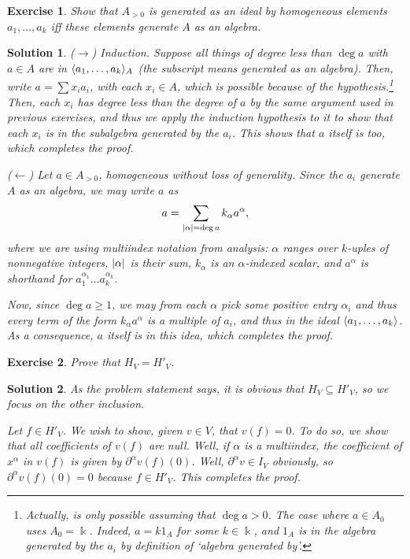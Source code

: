 \documentclass{article}
\newtheorem{ex}{Exercise}
\theoremstyle{nonumberplain}
\newtheorem{sol}{Solution}
\newcommand{\kk}{\Bbbk}
\DeclarePairedDelimiter{\abs}{\lvert}{\rvert}
\DeclarePairedDelimiter{\braket}{\langle}{\rangle}
\begin{document}
\begin{ex}
Show that $A_{>0}$ is generated as an ideal by homogeneous elements $a_1, \dots, a_k$ iff these elements generate $A$ as an algebra.
\end{ex}

\begin{sol}
($\rightarrow$) Induction. Suppose all things of degree less than $\deg a$ with $a \in A$ are in $\braket{a_1, \dots, a_k}_A$ (the subscript means generated as an algebra). Then, write $a = \sum x_i a_i$, with each $x_i \in A$, which is possible because of the hypothesis.\footnote{Actually, is only possible assuming that $\deg a > 0$. The case where $a \in A_0$ uses $A_0 = \kk$. Indeed, $a = k 1_A$ for some $k \in \kk$, and $1_A$ is in the algebra generated by the $a_i$ by definition of `algebra generated by'.} Then, each $x_i$ has degree less than the degree of $a$ by the same argument used in previous exercises, and thus we apply the induction hypothesis to it to show that each $x_i$ is in the subalgebra generated by the $a_i$. This shows that $a$ itself is too, which completes the proof.

($\leftarrow$) Let $a \in A_{>0}$, homogeneous without loss of generality. Since the $a_i$ generate $A$ as an algebra, we may write $a$ as
\begin{equation}
a = \sum_{\abs{\alpha} = \deg a} k_\alpha a^\alpha,
\end{equation}
where we are using multiindex notation from analysis: $\alpha$ ranges over $k$-uples of nonnegative integers, $\abs{\alpha}$ is their sum, $k_\alpha$ is an $\alpha$-indexed scalar, and $a^\alpha$ is shorthand for $a_1^{\alpha_1} \dots a_k^{\alpha_k}$.

Now, since $\deg a \geq 1$, we may from each $\alpha$ pick some positive entry $\alpha_i$ and thus every term of the form $k_\alpha a^\alpha$ is a multiple of $a_i$, and thus in the ideal $\braket{a_1, \dots, a_k}$. As a consequence, $a$ itself is in this idea, which completes the proof.
\end{sol}

\begin{ex}
Prove that $H_V = H'_V$.
\end{ex}

\begin{sol}
As the problem statement says, it is obvious that $H_V \subseteq H'_V$, so we focus on the other inclusion.

Let $f \in H'_V$. We wish to show, given $v \in V$, that $v(f) = 0$. To do so, we show that all coefficients of $v(f)$ are null. Well, if $\alpha$ is a multiindex, the coefficient of $x^\alpha$ in $v(f)$ is given by $\partial^\alpha v(f)(0)$. Well, $\partial^\alpha v \in I_V$ obviously, so $\partial^\alpha v(f)(0) = 0$ because $f \in H'_V$. This completes the proof.
\end{sol}
\end{document}
